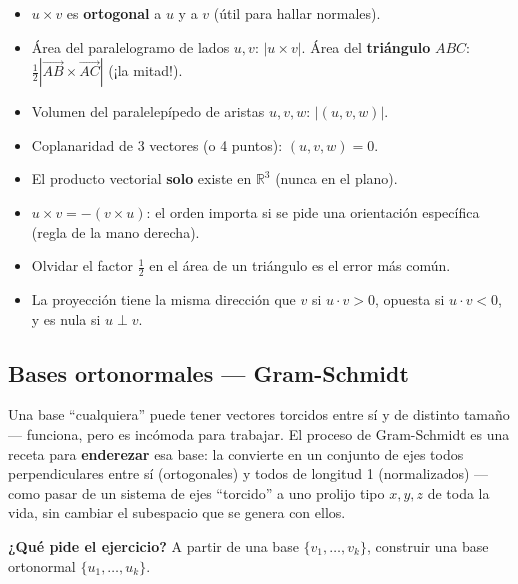 \documentclass[11pt,a4paper]{article}
\newcommand{\qpide}[1]{\textbf{¿Qué pide el ejercicio?} #1\par}
\begin{document}
\begin{proc}
\begin{itemize}
    \item $u\times v$ es \textbf{ortogonal} a $u$ y a $v$ (útil para hallar normales).
    \item Área del paralelogramo de lados $u,v$: $|u\times v|$. Área del
    \textbf{triángulo} $ABC$: $\frac12\left|\overrightarrow{AB}\times\overrightarrow{AC}\right|$ (¡la mitad!).
    \item Volumen del paralelepípedo de aristas $u,v,w$: $|(u,v,w)|$.
    \item Coplanaridad de 3 vectores (o 4 puntos): $(u,v,w)=0$.
\end{itemize}
\end{proc}

\begin{atencion}
\begin{itemize}
    \item El producto vectorial \textbf{solo} existe en $\mathbb R^3$ (nunca en el plano).
    \item $u\times v=-(v\times u)$: el orden importa si se pide una orientación específica
    (regla de la mano derecha).
    \item Olvidar el factor $\frac12$ en el área de un triángulo es el error más común.
    \item La proyección tiene la misma dirección que $v$ si $u\cdot v>0$, opuesta si
    $u\cdot v<0$, y es nula si $u\perp v$.
\end{itemize}
\end{atencion}

\subsection{Bases ortonormales --- Gram-Schmidt}

\begin{intuicion}
Una base ``cualquiera'' puede tener vectores torcidos entre sí y de distinto tamaño —
funciona, pero es incómoda para trabajar. El proceso de Gram-Schmidt es una receta para
\textbf{enderezar} esa base: la convierte en un conjunto de ejes todos perpendiculares
entre sí (ortogonales) y todos de longitud 1 (normalizados) — como pasar de un sistema de
ejes ``torcido'' a uno prolijo tipo $x,y,z$ de toda la vida, sin cambiar el subespacio que
se genera con ellos.
\end{intuicion}

\qpide{A partir de una base $\{v_1,\dots,v_k\}$, construir una base ortonormal
$\{u_1,\dots,u_k\}$.}
\end{document}
